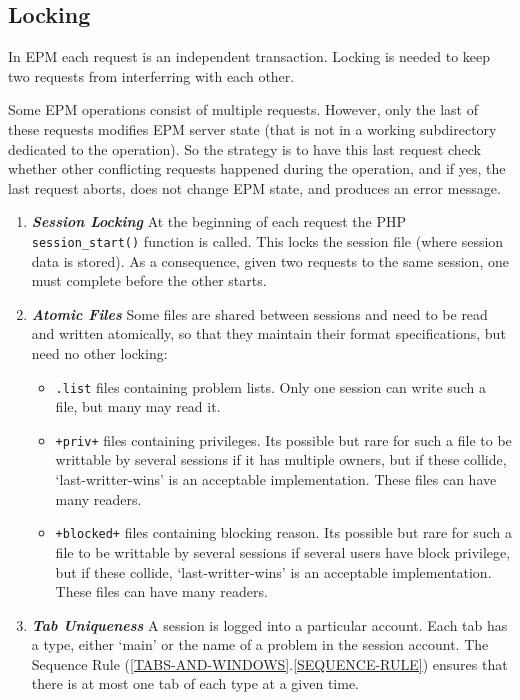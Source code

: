 \documentclass[12pt]{article}
\newcommand{\key}[1]{{\bf \em #1}}
\newcommand{\sref}[2]{(\ref{#1}.\ref{#2})}
\begin{document}
\subsection{Locking}

In EPM each request is an independent transaction.  Locking
is needed to keep two requests from interferring with each other.

Some EPM operations consist of multiple requests.  However,
only the last of these requests modifies EPM server state
(that is not in a working subdirectory dedicated to the operation).
So the strategy is to have this last request check whether
other conflicting requests happened during the operation, and
if yes, the last request aborts, does not change EPM state, and produces
an error message.

\begin{enumerate}

\item \key{Session Locking} At the beginning of each request
the PHP {\tt session\_start()} function is called.  This locks
the session file (where session data is stored).  As a consequence,
given two requests to the same session, one must complete before
the other starts.

\item \key{Atomic Files}
Some files are shared between sessions and need to be
read and written atomically, so that they maintain their
format specifications, but need no other locking:
\begin{itemize}
\item {\tt .list} files containing problem lists.  Only one
session can write such a file, but many may read it.
\item {\tt +priv+} files containing privileges.  Its possible
but rare for such a file to be writtable by several sessions if it has
multiple owners, but if these collide, `last-writter-wins' is
an acceptable implementation.  These files can have many readers.
\item {\tt +blocked+} files containing blocking reason.  Its possible
but rare for such a file to be writtable by several sessions if several
users have block privilege, but if these collide, `last-writter-wins' is
an acceptable implementation.  These files can have many readers.
\end{itemize}

\item \key{Tab Uniqueness}
A session is logged into a particular
account.  Each tab has a type, either `main'
or the name of a problem in the session account.
The Sequence Rule \sref{TABS-AND-WINDOWS}{SEQUENCE-RULE}
ensures that there is at most one tab of each type at a given
time.


\end{enumerate}
\end{document}
